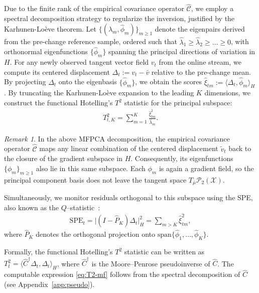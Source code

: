 \documentclass{article}
\theoremstyle{plain}
\theoremstyle{definition}
\theoremstyle{remark}
\newtheorem{remark}[theorem]{Remark}
\begin{document}
Due to the finite rank of the empirical covariance operator $\widehat{\mathcal{C}}$, we employ a spectral decomposition strategy to regularize the inversion, justified by the Karhunen-Lo\`eve theorem.
Let $\{(\widehat\lambda_m, \widehat\phi_m)\}_{m\ge 1}$ denote the eigenpairs derived from the pre-change reference sample, ordered such that $\widehat\lambda_1 \ge \widehat\lambda_2 \ge \dots \ge 0$, with orthonormal eigenfunctions $\{\widehat\phi_m\}$ spanning the principal directions of variation in $H$.
For any newly observed tangent vector field $v_t$ from the online stream, we compute its centered displacement $\Delta_t := v_t - \bar{v}$ relative to the pre-change mean.
By projecting $\Delta_t$ onto the eigenbasis $\{\widehat\phi_m\}$, we obtain the scores $\widehat\xi_{tm} := \langle \Delta_t, \widehat\phi_m \rangle_H$.
By truncating the Karhunen-Lo\`eve expansion to the leading $K$ dimensions, we construct the functional Hotelling's $T^2$ statistic for the principal subspace:
\begin{align}\label{eq:T2-mf}
T_{t,K}^2 = \sum_{m=1}^K \frac{\widehat\xi_{tm}^2}{\widehat\lambda_m}.
\end{align}
\begin{remark}
In the above MFPCA decomposition, the empirical covariance operator $\widehat{\mathcal{C}}$ maps any linear combination of the centered displacement $\tilde v_t$ back to the closure of the gradient subspace in $H$. 
Consequently, its eigenfunctions $\{\phi_m\}_{m\ge 1}$ also lie in this same subspace. 
Each $\phi_m$ is again a gradient field, so the principal component basis does not leave the tangent space $T_{\bar\mu}\mathcal{P}_2(\mathcal{X})$. 
\end{remark}

Simultaneously, we monitor residuals orthogonal to this subspace using the SPE, also known as the $Q$–statistic~\citep{jackson1979control}:
\begin{align}\label{eq:SPE}
\mathrm{SPE}_t = \big|(I - \widehat P_K)\Delta_t\big|_H^2 = \sum_{m > K} \widehat\xi_{tm}^2,
\end{align}
where $\widehat P_K$ denotes the orthogonal projection onto $\mathrm{span}\{\widehat\phi_1, \dots, \widehat\phi_K\}$.

Formally, the functional Hotelling's $T^2$ statistic can be written as
$T_t^2=\langle \widehat C^\dagger \Delta_t,\Delta_t\rangle_H$,
where $\widehat C^\dagger$ is the Moore--Penrose pseudoinverse of $\widehat C$.
The computable expression \cref{eq:T2-mf} follows from the spectral decomposition of $\widehat C$
(see Appendix~\ref{app:pseudo}).
\end{document}
